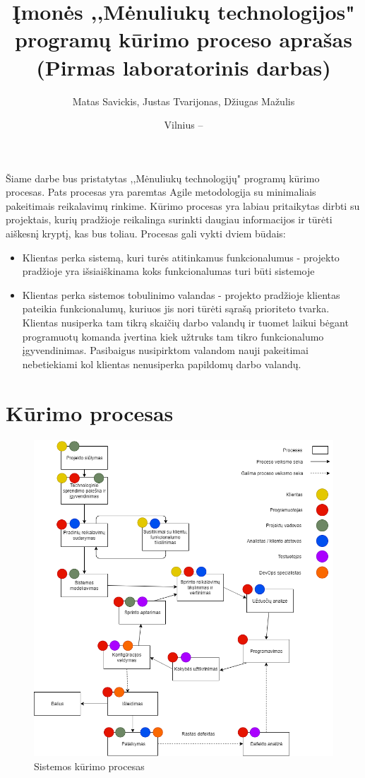 \documentclass{VUMIFPSkursinis}
\title{Įmonės ,,Mėnuliukų technologijos" programų kūrimo proceso aprašas (Pirmas laboratorinis darbas)}
\author{Matas Savickis, Justas Tvarijonas, Džiugas Mažulis}
\date{Vilnius – \the\year}
\begin{document}
\maketitle

\tableofcontents

	Šiame darbe bus pristatytas ,,Mėnuliukų technologijų" programų kūrimo procesas.
	Pats procesas yra paremtas Agile metodologija su minimaliais pakeitimais reikalavimų rinkime.
	Kūrimo procesas yra labiau pritaikytas dirbti su projektais, kurių pradžioje reikalinga surinkti daugiau informacijos ir tūrėti aiškesnį kryptį, kas bus toliau. Procesas gali vykti dviem būdais:
	\begin{itemize}
		\item{Klientas perka sistemą, kuri turės atitinkamus funkcionalumus - projekto pradžioje yra išsiaiškinama koks funkcionalumas turi būti sistemoje}
		\item{
			Klientas perka sistemos tobulinimo valandas - projekto pradžioje klientas pateikia funkcionalumų, kuriuos jis nori tūrėti sąrašą prioriteto tvarka.
			Klientas nusiperka tam tikrą skaičių darbo valandų ir tuomet laikui bėgant programuotų komanda įvertina kiek užtruks tam tikro funkcionalumo įgyvendinimas.
			Pasibaigus nusipirktom valandom nauji pakeitimai nebetiekiami kol klientas nenusiperka papildomų darbo valandų.
		}
\end{itemize}
\section{Kūrimo procesas}
	\begin{figure}[htbp]
	\includegraphics[scale=0.6]{img/SoftwareProcessMoonTechnologies}
	\caption{Sistemos kūrimo procesas} %
	\label{img:kurimoProcesas}
	\end{figure}
\end{document}
